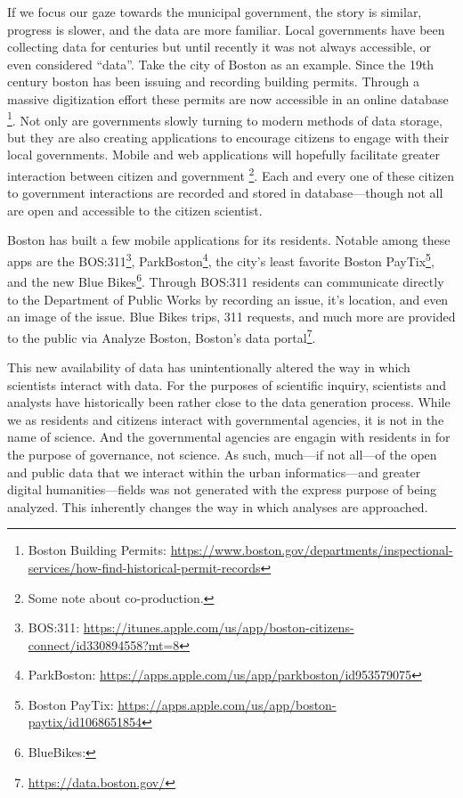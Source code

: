 \documentclass[
]{book}
\begin{document}
If we focus our gaze towards the municipal government, the story is similar, progress is slower, and the data are more familiar. Local governments have been collecting data for centuries but until recently it was not always accessible, or even considered ``data''. Take the city of Boston as an example. Since the 19th century boston has been issuing and recording building permits. Through a massive digitization effort these permits are now accessible in an online database \footnote{Boston Building Permits: \url{https://www.boston.gov/departments/inspectional-services/how-find-historical-permit-records}}. Not only are governments slowly turning to modern methods of data storage, but they are also creating applications to encourage citizens to engage with their local governments. Mobile and web applications will hopefully facilitate greater interaction between citizen and government \footnote{Some note about co-production.}. Each and every one of these citizen to government interactions are recorded and stored in database---though not all are open and accessible to the citizen scientist.

Boston has built a few mobile applications for its residents. Notable among these apps are the BOS:311\footnote{BOS:311: \url{https://itunes.apple.com/us/app/boston-citizens-connect/id330894558?mt=8}}, ParkBoston\footnote{ParkBoston: \url{https://apps.apple.com/us/app/parkboston/id953579075}}, the city's least favorite Boston PayTix\footnote{Boston PayTix: \url{https://apps.apple.com/us/app/boston-paytix/id1068651854}}, and the new Blue Bikes\footnote{BlueBikes:}. Through BOS:311 residents can communicate directly to the Department of Public Works by recording an issue, it's location, and even an image of the issue. Blue Bikes trips, 311 requests, and much more are provided to the public via Analyze Boston, Boston's data portal\footnote{\url{https://data.boston.gov/}}.

This new availability of data has unintentionally altered the way in which scientists interact with data. For the purposes of scientific inquiry, scientists and analysts have historically been rather close to the data generation process. While we as residents and citizens interact with governmental agencies, it is not in the name of science. And the governmental agencies are engagin with residents in for the purpose of governance, not science. As such, much---if not all---of the open and public data that we interact within the urban informatics---and greater digital humanities---fields was not generated with the express purpose of being analyzed. This inherently changes the way in which analyses are approached.
\end{document}
